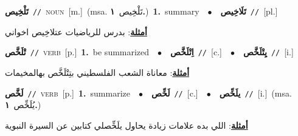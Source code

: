 \documentclass[10pt,a4paper,twoside]{article} %
\begin{document}
\begin{multicols}{2}
{\setlength\topsep{0pt}\textbf{\foreignlanguage{arabic}{تَلْخِيص}}\ {\color{gray}\texttt{//}\color{black}}\ \textsc{noun}\ [m.]\ \color{gray}(msa. \foreignlanguage{arabic}{تَلْخِيص}~\foreignlanguage{arabic}{\textbf{١.}})\color{black}\ \textbf{1.}~summary\ \ $\bullet$\ \ \setlength\topsep{0pt}\textbf{\foreignlanguage{arabic}{تَلَاخِيص}}\ {\color{gray}\texttt{//}\color{black}}\ [pl.]\  \begin{flushright}\color{gray}\foreignlanguage{arabic}{\textbf{\underline{\foreignlanguage{arabic}{أمثلة}}}: بدرس للرياضيات عتلاخِيص اخواني}\end{flushright}\color{black}} \vspace{2mm}

{\setlength\topsep{0pt}\textbf{\foreignlanguage{arabic}{تْلَخَّص}}\ {\color{gray}\texttt{//}\color{black}}\ \textsc{verb}\ [p.]\ \textbf{1.}~be summarized\ \ $\bullet$\ \ \setlength\topsep{0pt}\textbf{\foreignlanguage{arabic}{اِتْلَخَّص}}\ {\color{gray}\texttt{//}\color{black}}\ [c.]\ \ $\bullet$\ \ \setlength\topsep{0pt}\textbf{\foreignlanguage{arabic}{يِتْلَخَّص}}\ {\color{gray}\texttt{//}\color{black}}\ [i.]\  \begin{flushright}\color{gray}\foreignlanguage{arabic}{\textbf{\underline{\foreignlanguage{arabic}{أمثلة}}}: معاناة الشعب الفلسطيني بتِتْلَخَّص بهالمخيمات}\end{flushright}\color{black}} \vspace{2mm}

{\setlength\topsep{0pt}\textbf{\foreignlanguage{arabic}{لَخَّص}}\ {\color{gray}\texttt{//}\color{black}}\ \textsc{verb}\ [p.]\ \textbf{1.}~summarize\ \ $\bullet$\ \ \setlength\topsep{0pt}\textbf{\foreignlanguage{arabic}{لَخِّص}}\ {\color{gray}\texttt{//}\color{black}}\ [c.]\ \ $\bullet$\ \ \setlength\topsep{0pt}\textbf{\foreignlanguage{arabic}{يلَخِّص}}\ {\color{gray}\texttt{//}\color{black}}\ [i.]\ \color{gray}(msa. \foreignlanguage{arabic}{يُلَخِّص}~\foreignlanguage{arabic}{\textbf{١.}})\color{black}\  \begin{flushright}\color{gray}\foreignlanguage{arabic}{\textbf{\underline{\foreignlanguage{arabic}{أمثلة}}}: اللي بده علامات زيادة يحاول يلَخِّصلي كتابين عن السيرة النبوية}\end{flushright}\color{black}} \vspace{2mm}


\end{multicols}
\end{document}

